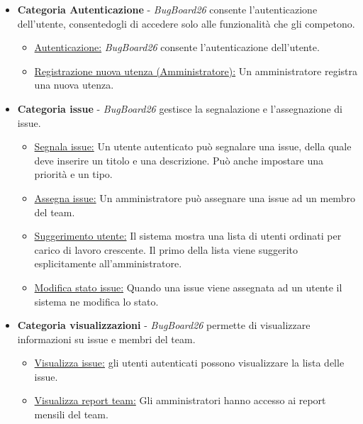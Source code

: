 \documentclass[a4paper,12pt]{article}
\begin{document}
\begin{itemize}
    \item \textbf{Categoria Autenticazione} - \textit{BugBoard26} consente l'autenticazione dell'utente, consentedogli di accedere solo alle funzionalità che gli competono.
    \begin{itemize}
        \item \hyperref[sec:RE01]{Autenticazione:} \textit{BugBoard26} consente l'autenticazione dell'utente.
        \item \hyperref[sec:RE02]{Registrazione nuova utenza (Amministratore):} Un amministratore registra una nuova utenza. 
    \end{itemize}
    \item \textbf{Categoria issue} - \textit{BugBoard26} gestisce la segnalazione e l'assegnazione di issue.
    \begin{itemize}
        \item \hyperref[sec:RE03]{Segnala issue:} Un utente autenticato può segnalare una issue, della quale deve inserire un titolo e una descrizione. Può anche impostare una priorità e un tipo. 
        \item \hyperref[sec:RE04]{Assegna issue:} Un amministratore può assegnare una issue ad un membro del team.
        \item\hyperref[sec:RE13]{Suggerimento utente:} Il sistema mostra una lista di utenti ordinati per carico di lavoro crescente. Il primo della lista viene suggerito esplicitamente all'amministratore.
        \item \hyperref[sec:RE04]{Modifica stato issue:} Quando una issue viene assegnata ad un utente il sistema ne modifica lo stato. 
    \end{itemize}
    \item \textbf{Categoria visualizzazioni} -  \textit{BugBoard26} permette di visualizzare informazioni su issue e membri del team.
    \begin{itemize}
        \item \hyperref[sec:RE05]{Visualizza issue:} gli utenti autenticati possono visualizzare la lista delle issue.
        \item \hyperref[sec:RE06]{Visualizza report team:} Gli amministratori hanno accesso ai report mensili del team.

\end{itemize}
\end{itemize}
\end{document}
